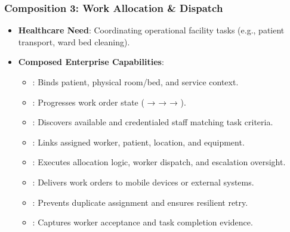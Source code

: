 \subsubsection*{Composition 3: Work Allocation \& Dispatch}
\label{rad:enterprise:304}

\begin{itemize}

\item 
\textbf{Healthcare Need}: Coordinating operational facility tasks (e.g., patient transport, ward bed cleaning).



\item 
\textbf{Composed Enterprise Capabilities}:


\begin{itemize}

\item 
\texttt{}: Binds patient, physical room/\allowbreak{}bed, and service context.



\item 
\texttt{}: Progresses work order state (\texttt{} → \texttt{} → \texttt{} → \texttt{}).



\item 
\texttt{}: Discovers available and credentialed staff matching task criteria.



\item 
\texttt{}: Links assigned worker, patient, location, and equipment.



\item 
\texttt{}: Executes allocation logic, worker dispatch, and escalation oversight.



\item 
\texttt{}: Delivers work orders to mobile devices or external systems.



\item 
\texttt{}: Prevents duplicate assignment and ensures resilient retry.



\item 
\texttt{}: Captures worker acceptance and task completion evidence.



\end{itemize}


\end{itemize}
\label{rad:enterprise:315}

